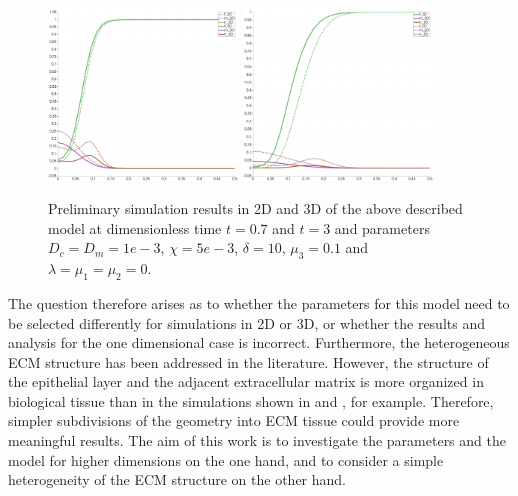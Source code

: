 \documentclass[12pt]{article}
\begin{document}
 \begin{figure}[!h]
 \includegraphics[width=0.45\textwidth]{anderson_tumor_invasion_model_2Dvs3Dtime0_7_thick.png}
 \includegraphics[width=0.45\textwidth]{anderson_tumor_invasion_model_2Dvs3D_time3_thick.png}
 \caption{Preliminary simulation results in 2D and 3D of the above described model at dimensionless time $t=0.7$ and $t=3$ and parameters $D_c=D_m=1e-3$, $\chi=5e-3$, $\delta=10$, $\mu_3=0.1$ and $\lambda=\mu_1=\mu_2 = 0$. }
 \label{fig:fig1}
\end{figure}
 The question therefore arises as to whether the parameters for this model need to be selected differently for simulations in 2D or 3D, or whether the results and analysis for the one dimensional case is incorrect. \newline
 Furthermore, the heterogeneous ECM structure has been addressed in the literature. However, the structure of the epithelial layer and the adjacent extracellular matrix is more organized in biological tissue than in the simulations shown in \cite{anderson_mathematical_2000} and \cite{chaplain_mathematical_2006-1}, for example. Therefore, simpler subdivisions of the geometry into ECM tissue could provide more meaningful results. \newline
 The aim of this work is to investigate the parameters and the model for higher dimensions on the one hand, and to consider a simple heterogeneity of the ECM structure on the other hand.
 \newpage
\printbibliography[title={Literatur}]
\newpage
\end{document}
